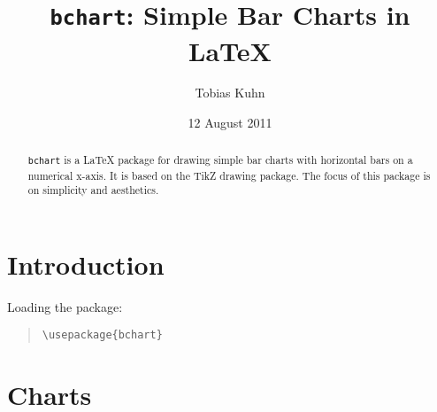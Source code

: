 \documentclass{article}
\title{\texttt{bchart}: Simple Bar Charts in \LaTeX}
\author{Tobias Kuhn}
\date{12 August 2011}
\begin{document}
\maketitle

\begin{abstract}
\texttt{bchart} is a {\LaTeX} package for drawing simple bar charts with horizontal bars on a numerical x-axis. It is based on the TikZ drawing package. The focus of this package is on simplicity and aesthetics.
\end{abstract}


\section{Introduction}

Loading the package:
\begin{quote}\small
\begin{verbatim}
\usepackage{bchart}
\end{verbatim}
\end{quote}


\section{Charts}
\end{document}
